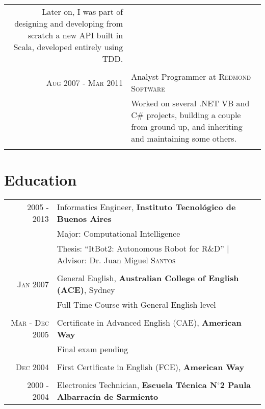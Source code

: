 \documentclass[a4paper,10pt]{article}
\begin{document}
\begin{tabular}{r|p{11cm}}
{ Later on, I was part of designing and developing from scratch a new API built in Scala, developed entirely using TDD.}\\

\multicolumn{2}{c}{} \\

\textsc{Aug 2007 - Mar 2011} & Analyst Programmer at \textsc{Redmond Software} \\
 &\footnotesize{Worked on several .NET VB and C\# projects, building a couple from ground up, and inheriting and maintaining some others.}\\

\multicolumn{2}{c}{} \\

\end{tabular}

\section{Education}
\begin{tabular}{r|l}	
 \normalsize 2005 - 2013 & Informatics Engineer, \textbf{Instituto Tecnológico de Buenos Aires}\\
& Major: \small Computational Intelligence \\
& Thesis: \small ``ItBot2: Autonomous Robot for R\&D'' |  Advisor: Dr. Juan Miguel \textsc{Santos}\\

\multicolumn{2}{c}{} \\

\normalsize \textsc{Jan} 2007 & General English, \textbf{Australian College of English (ACE)}, Sydney\\
& \small Full Time Course with General English level \\

\multicolumn{2}{c}{} \\

\normalsize \textsc{Mar - Dec} 2005 & Certificate in Advanced English (CAE), \textbf{American Way}\\
& \small Final exam pending \\

\multicolumn{2}{c}{} \\

\normalsize \textsc{Dec} 2004 & First Certificate in English (FCE), \textbf{American Way}\\

\multicolumn{2}{c}{} \\

2000 - 2004 & Electronics Technician, \normalsize\textbf{Escuela Técnica N$^{\circ}$2 Paula Albarracín de Sarmiento}\\

\end{tabular}
\end{document}

